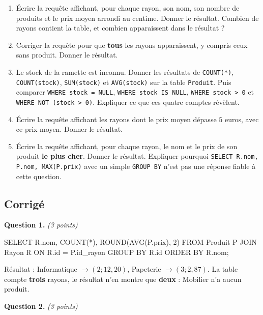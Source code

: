 \begin{enumerate}
  \item Écrire la requête affichant, pour chaque rayon, son nom, son nombre de
    produits et le prix moyen arrondi au centime. Donner le résultat. Combien
    de rayons contient la table, et combien apparaissent dans le résultat ?

  \item Corriger la requête pour que \textbf{tous} les rayons apparaissent, y
    compris ceux sans produit. Donner le résultat.

  \item Le stock de la ramette est inconnu. Donner les résultats de
    \lstinline{COUNT(*)}, \lstinline{COUNT(stock)}, \lstinline{SUM(stock)} et
    \lstinline{AVG(stock)} sur la table \lstinline{Produit}. Puis comparer
    \lstinline{WHERE stock = NULL}, \lstinline{WHERE stock IS NULL},
    \lstinline{WHERE stock > 0} et \lstinline{WHERE NOT (stock > 0)}. Expliquer
    ce que ces quatre comptes révèlent.

  \item Écrire la requête affichant les rayons dont le prix moyen dépasse
    $5$ euros, avec ce prix moyen. Donner le résultat.

  \item Écrire la requête affichant, pour chaque rayon, le nom et le prix de son
    produit \textbf{le plus cher}. Donner le résultat. Expliquer pourquoi
    \lstinline{SELECT R.nom, P.nom, MAX(P.prix)} avec un simple
    \lstinline{GROUP BY} n'est pas une réponse fiable à cette question.
\end{enumerate}

\subsection*{Corrigé}

\textbf{Question 1.} \emph{(3 points)}

\begin{sql}
SELECT R.nom, COUNT(*), ROUND(AVG(P.prix), 2)
FROM Produit P JOIN Rayon R ON R.id = P.id_rayon
GROUP BY R.id ORDER BY R.nom;
\end{sql}

Résultat : Informatique $\rightarrow (2 ; 12{,}20)$, Papeterie
$\rightarrow (3 ; 2{,}87)$. La table compte \textbf{trois} rayons, le résultat
n'en montre que \textbf{deux} : Mobilier n'a aucun produit.

\medskip
\textbf{Question 2.} \emph{(3 points)}


